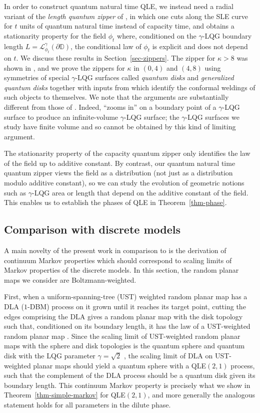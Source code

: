 \documentclass[a4paper]{article}
\numberwithin{equation}{section}
\newcommand{\D}{\mathbb{D}}
\newcommand{\cL}{\mathcal{L}}
\theoremstyle{remark}
\numberwithin{equation}{section}
\begin{document}
In order to construct quantum natural time QLE, we instead need a radial variant of the \emph{length quantum zipper} of \cite[Theorem 1.8]{shef-zipper}, in which one cuts along the SLE curve for $t$ units of quantum natural time instead of capacity time, and obtains a stationarity property for the field $\phi_t$ where, conditioned on the $\gamma$-LQG boundary length $L = \cL^{\gamma}_{\phi_t}(\partial \D)$, the conditional law of $\phi_t$ is explicit and does not depend on $t$. We discuss these results in Section~\ref{sec-zippers}. The zipper for $\kappa > 8$ was shown in \cite{ay-reversibility}, and we prove the zippers for $\kappa$ in $(0,4)$ and $(4,8)$ using symmetries of special $\gamma$-LQG surfaces called \emph{quantum disks} and \emph{generalized quantum disks} together with inputs from \cite{ay-radial} which identify the conformal weldings of such objects to themselves. We note that the arguments are substantially different from those of \cite[Theorem 1.8]{shef-zipper}. Indeed, \cite{shef-zipper} ``zooms in'' on a boundary point of a $\gamma$-LQG surface to produce an infinite-volume $\gamma$-LQG surface;  the $\gamma$-LQG surfaces we study have finite volume and so cannot be obtained by this kind of limiting argument. 

The stationarity property of the capacity quantum zipper only identifies the law of the field up to additive constant. By contrast, our quantum natural time quantum zipper views the field as a distribution (not just as a distribution modulo additive constant), so we can study the evolution of geometric notions such as $\gamma$-LQG area or length that depend on the additive constant of the field. This enables us to establish the phases of QLE in Theorem~\ref{thm-phase}. 


\subsection{Comparison with discrete models}\label{subsec-intro-discrete}
A main novelty of the present work in comparison to \cite{ms-qle} is the derivation of continuum Markov properties which should correspond to scaling limits of Markov properties of the discrete models. In this section, the random planar maps we consider are  Boltzmann-weighted.

First, when a uniform-spanning-tree (UST) weighted random planar map has a DLA ($1$-DBM) process on it grown until it reaches its target point, cutting the edges comprising the DLA gives a random planar map with the disk topology such that, conditioned on its boundary length, it has the law of a UST-weighted random planar map \cite[Proposition 2.3 (iii)]{ms-qle}. Since the scaling limit of UST-weighted random planar maps with the sphere and disk topologies is the quantum sphere and quantum disk with the LQG parameter $\gamma = \sqrt2$ \cite{mullin-maps, shef-burger, DMS14}, the scaling limit of DLA on UST-weighted planar maps should yield a quantum sphere with a QLE$(2,1)$ process, such that the complement of the DLA process should be a quantum disk given its boundary length. 
This continuum Markov property is precisely what we show in Theorem~\ref{thm-simple-markov} for QLE$(2,1)$, and more generally the analogous statement holds for all parameters in the dilute phase.
\end{document}
